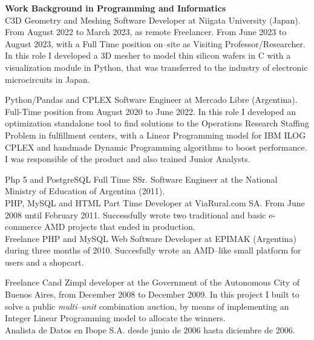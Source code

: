 \textbf{Work Background in Programming and Informatics}\\[6pt]
C\masmas 3D Geometry and Meshing Software Developer at Niigata University
(Japan). 
From August 2022 to March 2023, as remote Freelancer.
From June 2023 to August 2023, with a Full Time position on--site as Visiting
Professor/Researcher.
In this role I developed a 3D mesher to model thin silicon wafers in C\masmas
with a visualization module in Python, that was transferred to the industry of
electronic microcircuits in Japan.

Python/Pandas and CPLEX Software Engineer at Mercado Libre (Argentina). 
Full-Time position from August 2020 to June 2022. In this role I developed an 
optimization standalone tool to find solutions to the
Operations Research Staffing Problem in fulfillment centers, with
a Linear Programming model for IBM ILOG CPLEX and handmade Dynamic Programming
algorithms to boost performance. I was responsible of the product and also
trained Junior Analysts.

Php 5 and PostgreSQL Full Time SSr. Software Engineer at the
National Ministry of Education of Argentina (2011).\\[4pt]

PHP, MySQL and HTML Part Time Developer at ViaRural.com SA. From June 2008
until February 2011.
Successfully wrote two traditional and basic e-commerce AMD projects
that ended in production.\\[4pt]

Freelance PHP and MySQL Web Software Developer at EPIMAK (Argentina)
during three months of 2010. Succesfully wrote an AMD--like small 
platform for users and a shopcart.

Freelance C\masmas and Zimpl developer at the Government of the 
Autonomous City of Buenos Aires, from December 2008 to December 2009. 
In this project I built \href{https://github.com/alexisjawtu/ilp_auction}
{\color{blue}{an optimization software}} to solve a public
\emph{multi--unit} combination auction, by means of implementing
an Integer Linear Programming model to allocate the winners.\\[4pt]






Analista de Datos en Ibope S.A. desde junio de 2006 hasta diciembre de 2006.

